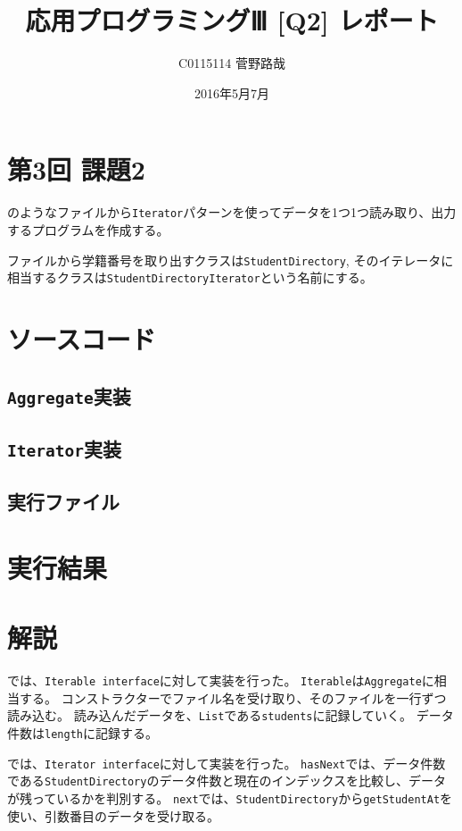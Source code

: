 \documentclass[uplatex]{jsarticle}
\title{応用プログラミングⅢ [Q2] レポート}
\author{C0115114 菅野路哉}
\date{2016年5月7月}
\begin{document}
\maketitle

\section{第3回 課題2}
のようなファイルから{\tt Iterator}パターンを使ってデータを1つ1つ読み取り、出力するプログラムを作成する。

ファイルから学籍番号を取り出すクラスは{\tt StudentDirectory}, そのイテレータに相当するクラスは{\tt StudentDirectoryIterator}という名前にする。



\section{ソースコード}
\subsection*{{\tt Aggregate}実装}


\subsection*{{\tt Iterator}実装}


\subsection*{実行ファイル}


\section{実行結果}



\section{解説}
では、{\tt Iterable interface}に対して実装を行った。
{\tt Iterable}は{\tt Aggregate}に相当する。
コンストラクターでファイル名を受け取り、そのファイルを一行ずつ読み込む。
読み込んだデータを、{\tt List}である{\tt students}に記録していく。
データ件数は{\tt length}に記録する。


では、{\tt Iterator interface}に対して実装を行った。
{\tt hasNext}では、データ件数である{\tt StudentDirectory}のデータ件数と現在のインデックスを比較し、データが残っているかを判別する。
{\tt next}では、{\tt StudentDirectory}から{\tt getStudentAt}を使い、引数番目のデータを受け取る。

\end{document}
